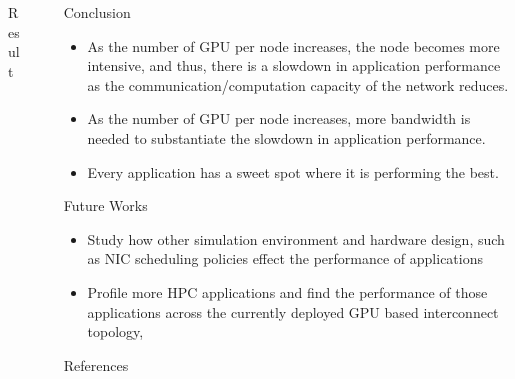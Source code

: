 \documentclass[final]{beamer}
\newlength{\sepwidth}
\newcommand{\separatorcolumn}{\begin{column}{\sepwidth}\end{column}}
\begin{document}
\begin{frame}[t]
\begin{columns}[t]
\begin{column}{0.5\textwidth}
\begin{block}{Result}
  \end{block}


\end{column}

\separatorcolumn

\begin{column}{0.2\textwidth}

  \begin{block}{Conclusion}

    \begin{itemize}
        \item As the number of GPU per node increases, the node becomes more intensive, and thus, there is a slowdown in application performance as the communication/computation capacity of the network reduces.
        \item As the number of GPU per node increases, more bandwidth is needed to substantiate the slowdown in application performance.
        \item Every application has a sweet spot where it is performing the best.
    \end{itemize}

  \end{block}

  \begin{block}{Future Works}

    \begin{itemize}
        \item Study how other simulation environment and hardware design, such as NIC scheduling policies effect the performance of applications
    
        \item Profile more HPC applications and find the performance of those applications across the currently deployed GPU based interconnect topology,
    \end{itemize}
    

  \end{block}

  \begin{block}{References}


\end{block}
\end{column}
\end{columns}
\end{frame}
\end{document}
